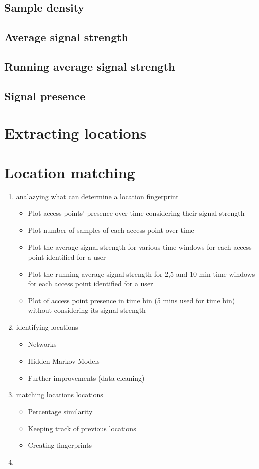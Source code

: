 \subsection{Sample density}
\subsection{Average signal strength}
\subsection{Running average signal strength}
\subsection{Signal presence}

\section{Extracting locations}
\section{Location matching}

\begin{enumerate}
  \item analazying what can determine a location fingerprint
	\begin{itemize}
		\item Plot access points’ presence over time considering their signal strength
		\item Plot number of samples of each access point over time
		\item Plot the average signal strength for various time windows for each
		access point identified for a user
		\item Plot the running average signal strength for 2,5 and 10 min time windows
		for each access point identified for a user
		\item Plot of access point presence in time bin (5 mins used for time bin)
		without considering its signal strength
	\end{itemize}
  \item identifying locations
	\begin{itemize}
		\item Networks 
		\item Hidden Markov Models 
		\item Further improvements (data cleaning)
	\end{itemize}
  \item matching locations locations
	\begin{itemize}
		\item Percentage similarity 
		\item Keeping track of previous locations 
		\item Creating fingerprints
	\end{itemize}
  \item  
\end{enumerate}
